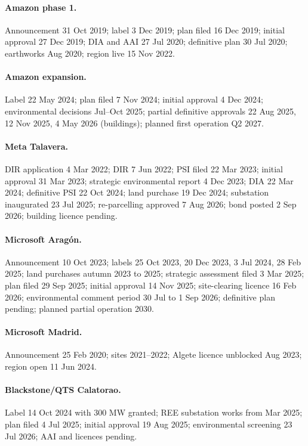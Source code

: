 \documentclass[11pt]{article}
\begin{document}
\paragraph{Amazon phase 1.} Announcement 31 Oct 2019; label 3 Dec 2019; plan filed 16 Dec 2019; initial approval 27 Dec 2019; DIA and AAI 27 Jul 2020; definitive plan 30 Jul 2020; earthworks Aug 2020; region live 15 Nov 2022.

\paragraph{Amazon expansion.} Label 22 May 2024; plan filed 7 Nov 2024; initial approval 4 Dec 2024; environmental decisions Jul--Oct 2025; partial definitive approvals 22 Aug 2025, 12 Nov 2025, 4 May 2026 (buildings); planned first operation Q2 2027.

\paragraph{Meta Talavera.} DIR application 4 Mar 2022; DIR 7 Jun 2022; PSI filed 22 Mar 2023; initial approval 31 Mar 2023; strategic environmental report 4 Dec 2023; DIA 22 Mar 2024; definitive PSI 22 Oct 2024; land purchase 19 Dec 2024; substation inaugurated 23 Jul 2025; re-parcelling approved 7 Aug 2026; bond posted 2 Sep 2026; building licence pending.

\paragraph{Microsoft Aragón.} Announcement 10 Oct 2023; labels 25 Oct 2023, 20 Dec 2023, 3 Jul 2024, 28 Feb 2025; land purchases autumn 2023 to 2025; strategic assessment filed 3 Mar 2025; plan filed 29 Sep 2025; initial approval 14 Nov 2025; site-clearing licence 16 Feb 2026; environmental comment period 30 Jul to 1 Sep 2026; definitive plan pending; planned partial operation 2030.

\paragraph{Microsoft Madrid.} Announcement 25 Feb 2020; sites 2021--2022; Algete licence unblocked Aug 2023; region open 11 Jun 2024.

\paragraph{Blackstone/QTS Calatorao.} Label 14 Oct 2024 with 300 MW granted; REE substation works from Mar 2025; plan filed 4 Jul 2025; initial approval 19 Aug 2025; environmental screening 23 Jul 2026; AAI and licences pending.
\end{document}
